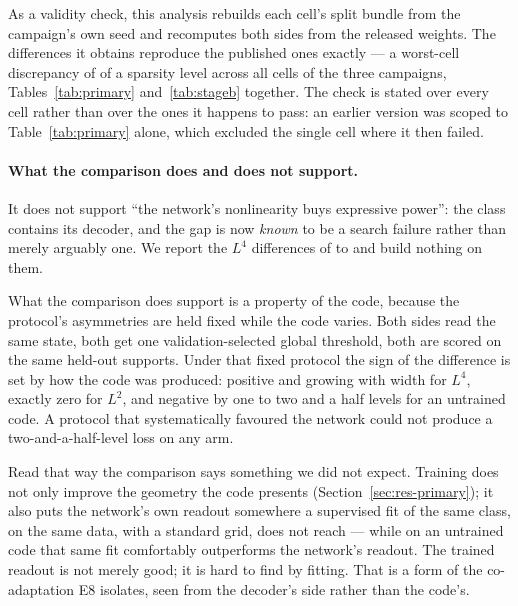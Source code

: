 As a validity check, this analysis rebuilds each cell's split bundle from the campaign's own seed and
recomputes both sides from the released weights. The differences it obtains reproduce the published
ones exactly --- a worst-cell discrepancy of \CeilReproMaxDelta{} of a sparsity level across all
\CeilReproCells{} cells of the three campaigns, Tables~\ref{tab:primary} and~\ref{tab:stageb}
together. The check is stated over every cell rather than over the ones it happens to pass: an
earlier version was scoped to Table~\ref{tab:primary} alone, which excluded the single cell where it
then failed.

\paragraph{What the comparison does and does not support.} It does not support ``the network's
nonlinearity buys expressive power'': the class contains its decoder, and the gap is now
\emph{known} to be a search failure rather than merely arguably one. We report the $L^4$ differences
of \PrimLfourHundredPostDiff{} to \ScPrimDiff{} and build nothing on them.

What the comparison does support is a property of the code, because the protocol's asymmetries are
held fixed while the code varies. Both sides read the same state, both get one validation-selected
global threshold, both are scored on the same held-out supports. Under that fixed protocol the sign
of the difference is set by how the code was produced: positive and growing with width for $L^4$,
exactly zero for $L^2$, and negative by one to two and a half levels for an untrained code. A
protocol that systematically favoured the network could not produce a two-and-a-half-level loss on
any arm.

Read that way the comparison says something we did not expect. Training does not only improve the
geometry the code presents (Section~\ref{sec:res-primary}); it also puts the network's own readout
somewhere a supervised fit of the same class, on the same data, with a standard grid, does not
reach --- while on an untrained code that same fit comfortably outperforms the network's readout.
The trained readout is not merely good; it is hard to find by fitting. That is a form of the
co-adaptation E8 isolates, seen from the decoder's side rather than the code's.

